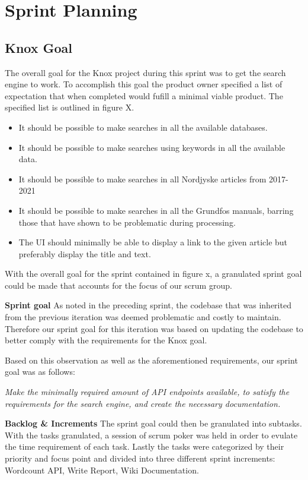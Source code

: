 \section{Sprint Planning}
\subsection{Knox Goal}
The overall goal for the Knox project during this sprint was to get the search engine to work. To accomplish this goal the product owner specified a list of expectation that when completed would fufill a minimal viable product. The specified list is outlined in figure X.
\begin{itemize}
	\item It should be possible to make searches in all the available databases.
	\item It should be possible to make searches using keywords in all the available data.
	\item It should be possible to make searches in all Nordjyske articles from 2017-2021
	\item It should be possible to make searches in all the Grundfos manuals, barring those that have shown to be problematic during processing.
	\item The UI should minimally be able to display a link to the given article but preferably display the title and text.
\end{itemize}

With the overall goal for the sprint contained in figure x, a granulated sprint goal could be made that accounts for the focus of our scrum group.


\textbf{Sprint goal}
As noted in the preceding sprint, the codebase that was inherited from the previous iteration was deemed problematic and costly to maintain. Therefore our sprint goal for this iteration was based on updating the codebase to better comply with the requirements for the Knox goal.


Based on this observation as well as the aforementioned requirements, our sprint goal was as follows:


\textit{Make the minimally required amount of API endpoints available, to satisfy the requirements for the search engine, and create the necessary documentation.}


\textbf{Backlog \& Increments}
The sprint goal could then be granulated into subtasks. With the tasks granulated, a session of scrum poker was held in order to evulate the time requirement of each task. Lastly the tasks were categorized by their priority and focus point and divided into three different sprint increments: Wordcount API, Write Report, Wiki Documentation. 



